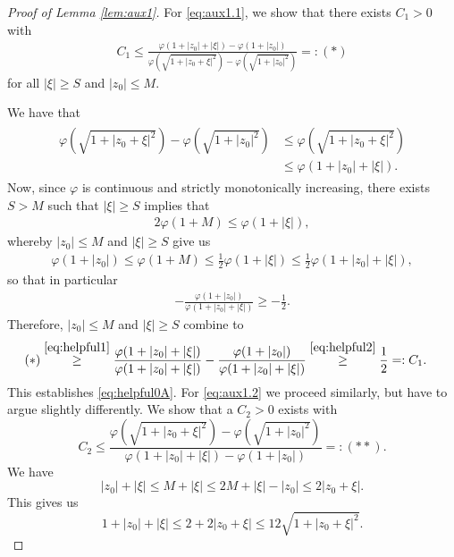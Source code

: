 \documentclass[a4paper,11pt]{amsart}
\numberwithin{equation}{section}
\begin{document}
	\begin{proof}[Proof of Lemma \ref{lem:aux1}] 
		For \eqref{eq:aux1.1}, we show that there exists $C_1>0$ with 
		\begin{align}\label{eq:helpful0A}
			C_1 \leq \frac{\varphi(1+|z_0|+|\xi|) - \varphi(1+|z_0|)}{\varphi(\sqrt{1+|z_0+\xi|^2}) - \varphi(\sqrt{1+|z_0|^2})} =: (*)
		\end{align}
		for all $|\xi|\geq S$ and $|z_{0}|\leq M$. 
		
		We have that 
		\begin{align}\label{eq:helpful1}
			\begin{split}
				\varphi(\sqrt{1+|z_{0}+\xi|^{2}})-\varphi(\sqrt{1+|z_{0}|^{2}}) & \leq \varphi(\sqrt{1+|z_{0}+\xi|^{2}}) \\ & \leq \varphi(1+|z_{0}|+|\xi|). 
			\end{split}
		\end{align}
		Now, since $\varphi$ is continuous and strictly monotonically increasing, there exists $S>M$ such that $|\xi|\geq S$ implies that 
		\begin{align*}
			2\varphi(1+M)\leq \varphi(1+|\xi|), 
		\end{align*}
		whereby $|z_{0}|\leq M$ and $|\xi|\geq S$ give us 
		\begin{align*}
			\varphi(1+|z_{0}|) \leq \varphi(1+M) \leq \frac{1}{2}\varphi(1+|\xi|)\leq \frac{1}{2}\varphi(1+|z_{0}|+|\xi|),
		\end{align*}
		so that in particular
		\begin{align}\label{eq:helpful2}
			-\frac{\varphi(1+|z_{0}|)}{\varphi(1+|z_{0}|+|\xi|)}\geq -\frac{1}{2}. 
		\end{align}
		Therefore, $|z_{0}|\leq M$ and $|\xi|\geq S$ combine to 
		\begin{align*}
			(*) & \stackrel{\eqref{eq:helpful1}}{\geq}  \frac{\varphi(1+|z_0|+|\xi|)}{\varphi(1+|z_{0}|+|\xi|)} - \frac{\varphi(1+|z_{0}|)}{\varphi(1+|z_{0}|+|\xi|)} \stackrel{\eqref{eq:helpful2}}{\geq} \frac{1}{2} =: C_1.
		\end{align*}
		This establishes \eqref{eq:helpful0A}.
		For \eqref{eq:aux1.2} we proceed similarly, but have to argue slightly differently. We show that a $C_2 > 0$ exists with \[
		C_2 \leq  \frac{\varphi(\sqrt{1+|z_0+\xi|^2}) - \varphi(\sqrt{1+|z_0|^2})}{\varphi(1+|z_0|+|\xi|) - \varphi(1+|z_0|)} =: (**).
		\]
		We have \[
		|z_0| + |\xi| \leq M + |\xi| \leq 2M + |\xi| - |z_0| \leq 2|z_0 + \xi|.
		\]
		This gives us \[
		1 + |z_0| + |\xi| \leq 2 + 2|z_0 + \xi| \leq 12\sqrt{1+|z_0+\xi|^2}.
\]
\end{proof}
\end{document}
